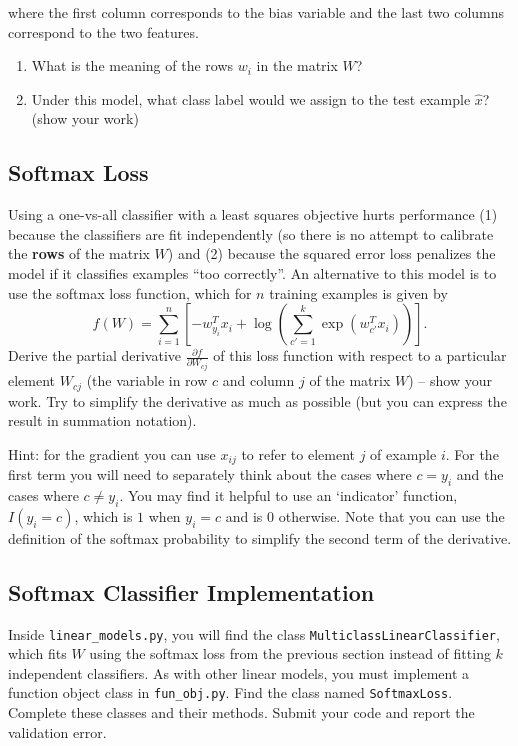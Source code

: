 \documentclass{article}
\def\blu#1{{\color{blu}#1}}
\let\ask\blu
\begin{document}
where the first column corresponds to the bias variable and the last two columns correspond to the two features.
\blu{
\begin{enumerate}
\item What is the meaning of the rows $w_i$ in the matrix $W$?
\item Under this model, what class label would we assign to the test example $\hat{x}$? (show your work)
\end{enumerate}}

\pagebreak

\subsection{Softmax Loss}

Using a one-vs-all classifier with a least squares objective hurts performance (1) because the classifiers are fit independently (so there is no attempt to calibrate the \textbf{rows} of the matrix $W$) and (2) because the squared error loss penalizes the model if it classifies examples ``too correctly''. An alternative to this model is to use the softmax loss function, which for $n$ training examples is given by
\[
f(W) = \sum_{i=1}^n \left[-w_{y_i}^Tx_i + \log\left(\sum_{c' = 1}^k \exp(w_{c'}^Tx_i)\right)\right].
\]
\blu{Derive the partial derivative $\frac{\partial f}{\partial W_{cj}}$ of this loss function with respect to a particular element $W_{cj}$ (the variable in row $c$ and column $j$ of the matrix $W$) -- show your work}. Try to simplify the derivative as much as possible (but you can express the result in summation notation).

Hint: for the gradient you can use $x_{ij}$ to refer to element $j$ of example $i$. For the first term you will need to separately think about the cases where $c=y_i$ and the cases where $c\neq y_i$. You may find it helpful to use an `indicator' function, $I(y_i = c)$, which is $1$ when $y_i = c$ and is $0$ otherwise. Note that you can use the definition of the softmax probability to simplify the second term of the derivative.


\pagebreak

\subsection{Softmax Classifier Implementation }

Inside \verb|linear_models.py|, you will find the class \verb|MulticlassLinearClassifier|, which fits $W$ using the softmax loss from the previous section instead of fitting $k$ independent classifiers. As with other linear models, you must implement a function object class in \verb|fun_obj.py|. Find the class named \verb|SoftmaxLoss|. Complete these classes and their methods. \ask{Submit your code and report the validation error.}
\end{document}
